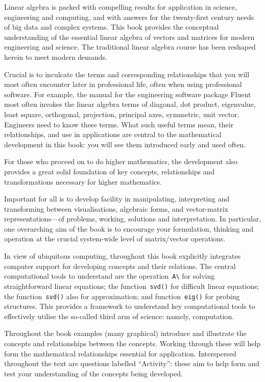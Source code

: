 Linear algebra is packed with compelling results for application in science, engineering and computing, and with answers for the twenty-first century needs of big data and complex systems.
This book provides the conceptual understanding of the essential linear algebra of vectors and matrices for modern engineering and science.
The traditional linear algebra course has been reshaped herein to meet modern demands.

Crucial is to inculcate the terms and corresponding relationships that you will most often encounter later in professional life, often when using professional software.  
For example, the manual for the engineering software package Fluent most often invokes the linear algebra terms of diagonal, dot product, eigenvalue, least square, orthogonal, projection, principal axes, symmetric, unit vector.
Engineers need to know these terms.
What such useful terms mean, their relationships, and use in applications are central to the mathematical development in this book: you will see them introduced early and used often.

For those who proceed on to do higher mathematics, the development also provides a great solid foundation of key concepts, relationships and transformations necessary for higher mathematics. 

Important for all is to develop facility in manipulating, interpreting and transforming between visualisations, algebraic forms, and vector-matrix representations---of problems, working, solutions and interpretation.
In particular, one overarching aim of the book is to encourage your formulation, thinking and operation at the crucial system-wide level of matrix\slash vector operations.

In view of ubiquitous computing, throughout this book explicitly integrates computer support for developing concepts and their relations.
The central computational tools to understand are the operation~\verb|A\| for solving straightforward linear equations; the function~\verb|svd()| for difficult linear equations; the function~\verb|svd()| also for approximation; and function~\verb|eig()| for probing structures.
This provides a framework to understand key computational tools to effectively utilise the so-called third arm of science: namely, computation. 

Throughout the book examples (many graphical) introduce and illustrate the concepts and relationships between the concepts.
Working through these will help form the mathematical relationships essential for application.
Interspersed throughout the text are questions labelled ``Activity'': these aim to help form and test your understanding of the concepts being developed.

